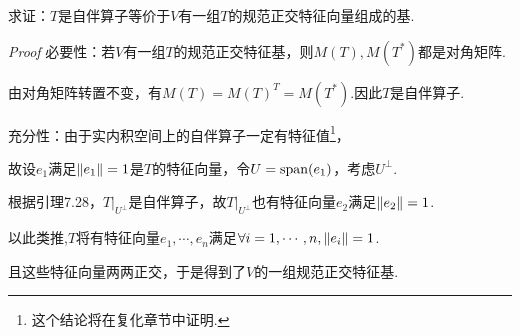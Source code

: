 求证：\(T\)是自伴算子等价于\(V\)有一组\(T\)的规范正交特征向量组成的基.

\textit{Proof}
必要性：若\(V\)有一组\(T\)的规范正交特征基，则\(M(T),M(T^*)\)都是对角矩阵.

由对角矩阵转置不变，有\(M(T)=M(T)^T=M(T^*)\).因此\(T\)是自伴算子.

充分性：由于实内积空间上的自伴算子一定有特征值\footnote{这个结论将在复化章节中证明.}，

故设\(e_1\)满足\(\left\lVert e_1 \right\rVert=1\)是\(T\)的特征向量，令\(U=\mathrm{span}(e_1)\)，考虑\(U^\bot\).

根据引理7.28，\(T|_{U^\bot}\)是自伴算子，故\(T|_{U^\bot}\)也有特征向量\(e_2\)满足\(\left\lVert e_2 \right\rVert=1\).

以此类推,\(T\)将有特征向量\(e_1,\cdots,e_n\)满足\(\forall i=1,\cdots,n,\left\lVert e_i \right\rVert=1\).

且这些特征向量两两正交，于是得到了\(V\)的一组规范正交特征基.

